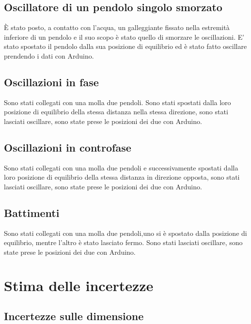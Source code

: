 \documentclass{article}
\begin{document}
		\subsection{  Oscillatore di un pendolo singolo smorzato }
            È stato posto, a contatto con l'acqua, un galleggiante fissato nella estremità inferiore di un pendolo e il suo scopo è stato quello di smorzare le oscillazioni. 
            E' stato spostato il pendolo dalla sua posizione di equilibrio ed è stato fatto oscillare prendendo i dati con Arduino.
            
		\subsection{  Oscillazioni in fase}
  
            Sono stati collegati con una molla due pendoli.
            Sono stati spostati dalla loro posizione di equilibrio della stessa distanza nella stessa direzione, sono stati lasciati oscillare, sono state prese le posizioni dei due con Arduino.
            
		\subsection{  Oscillazioni in controfase}
  
            Sono stati collegati con una molla due pendoli e successivamente 
            spostati dalla loro posizione di equilibrio della stessa distanza in direzione opposta, sono stati lasciati oscillare, sono state prese le posizioni dei due con Arduino.
  
		\subsection{  Battimenti}
  
            Sono stati collegati con una molla due pendoli,uno si è 
            spostato dalla posizione di equilibrio, mentre l'altro è stato lasciato fermo. Sono stati lasciati oscillare, sono state prese le posizioni dei due con Arduino.


            
\section{Stima delle incertezze}


  
		\subsection{Incertezze sulle dimensione}
\end{document}
